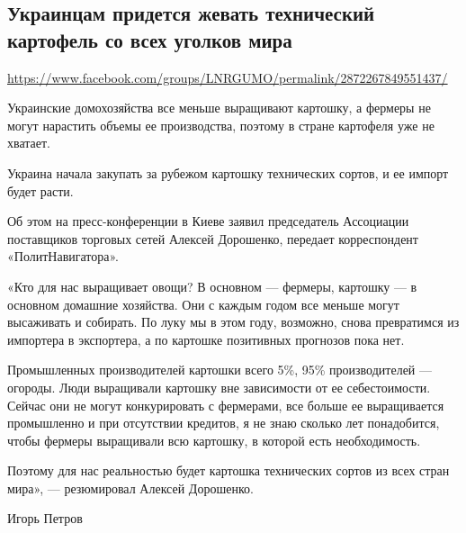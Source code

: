  
 

\subsection{Украинцам придется жевать технический картофель со всех уголков мира}
\label{sec:24_07_2020.fb.lnr.5}
\url{https://www.facebook.com/groups/LNRGUMO/permalink/2872267849551437/}


Украинские домохозяйства все меньше выращивают картошку, а фермеры не могут
нарастить объемы ее производства, поэтому в стране картофеля уже не хватает.

Украина начала закупать за рубежом картошку технических сортов, и ее импорт
будет расти.

Об этом на пресс-конференции в Киеве заявил председатель Ассоциации поставщиков
торговых сетей Алексей Дорошенко, передает корреспондент «ПолитНавигатора».

«Кто для нас выращивает овощи? В основном --- фермеры, картошку --- в основном
домашние хозяйства. Они с каждым годом все меньше могут высаживать и собирать.
По луку мы в этом году, возможно, снова превратимся из импортера в экспортера,
а по картошке позитивных прогнозов пока нет.

Промышленных производителей картошки всего 5\%, 95\% производителей --- огороды.
Люди выращивали картошку вне зависимости от ее себестоимости. Сейчас они не
могут конкурировать с фермерами, все больше ее выращивается промышленно и при
отсутствии кредитов, я не знаю сколько лет понадобится, чтобы фермеры
выращивали всю картошку, в которой есть необходимость.

Поэтому для нас реальностью будет картошка технических сортов из всех стран
мира», --- резюмировал Алексей Дорошенко.

Игорь Петров
  
